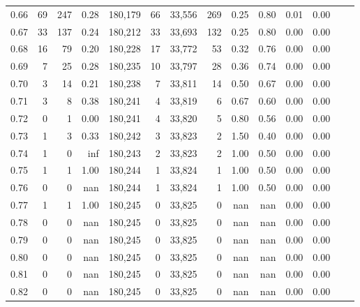 \begin{tabular}{rrrrrrrrrrrrrr}
0.66 &      69 &    247 &    0.28 &  180,179 &       66 &  33,556 &     269 &  0.25 &  0.80 &  0.01 &      0.00 \\
0.67 &      33 &    137 &    0.24 &  180,212 &       33 &  33,693 &     132 &  0.25 &  0.80 &  0.00 &      0.00 \\
0.68 &      16 &     79 &    0.20 &  180,228 &       17 &  33,772 &      53 &  0.32 &  0.76 &  0.00 &      0.00 \\
0.69 &       7 &     25 &    0.28 &  180,235 &       10 &  33,797 &      28 &  0.36 &  0.74 &  0.00 &      0.00 \\
0.70 &       3 &     14 &    0.21 &  180,238 &        7 &  33,811 &      14 &  0.50 &  0.67 &  0.00 &      0.00 \\
0.71 &       3 &      8 &    0.38 &  180,241 &        4 &  33,819 &       6 &  0.67 &  0.60 &  0.00 &      0.00 \\
0.72 &       0 &      1 &    0.00 &  180,241 &        4 &  33,820 &       5 &  0.80 &  0.56 &  0.00 &      0.00 \\
0.73 &       1 &      3 &    0.33 &  180,242 &        3 &  33,823 &       2 &  1.50 &  0.40 &  0.00 &      0.00 \\
0.74 &       1 &      0 &     inf &  180,243 &        2 &  33,823 &       2 &  1.00 &  0.50 &  0.00 &      0.00 \\
0.75 &       1 &      1 &    1.00 &  180,244 &        1 &  33,824 &       1 &  1.00 &  0.50 &  0.00 &      0.00 \\
0.76 &       0 &      0 &     nan &  180,244 &        1 &  33,824 &       1 &  1.00 &  0.50 &  0.00 &      0.00 \\
0.77 &       1 &      1 &    1.00 &  180,245 &        0 &  33,825 &       0 &   nan &   nan &  0.00 &      0.00 \\
0.78 &       0 &      0 &     nan &  180,245 &        0 &  33,825 &       0 &   nan &   nan &  0.00 &      0.00 \\
0.79 &       0 &      0 &     nan &  180,245 &        0 &  33,825 &       0 &   nan &   nan &  0.00 &      0.00 \\
0.80 &       0 &      0 &     nan &  180,245 &        0 &  33,825 &       0 &   nan &   nan &  0.00 &      0.00 \\
0.81 &       0 &      0 &     nan &  180,245 &        0 &  33,825 &       0 &   nan &   nan &  0.00 &      0.00 \\
0.82 &       0 &      0 &     nan &  180,245 &        0 &  33,825 &       0 &   nan &   nan &  0.00 &      0.00 \\

\end{tabular}
